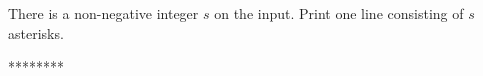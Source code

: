 




There is a non-negative integer $s$ on the input. Print one line consisting of $s$ asterisks.

\vystup
********
\koniec

